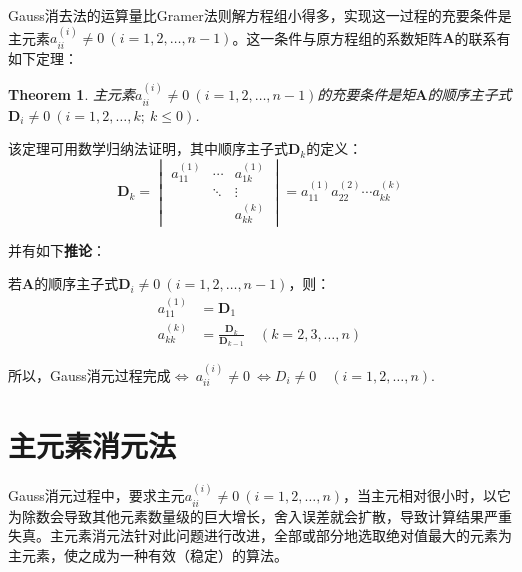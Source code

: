 Gauss消去法的运算量比Gramer法则解方程组小得多，实现这一过程的充要条件是主元素$a_{ii}^{(i)} \neq 0\ (i=1,2,\dots,n-1)$。这一条件与原方程组的系数矩阵$\boldsymbol{A}$的联系有如下定理：
\newtheorem{th4}{Theorem}[chapter]
\begin{th4}
    主元素$a_{ii}^{(i)} \neq 0\ (i=1,2,\dots,n-1)$的充要条件是矩$\boldsymbol{A}$的顺序主子式$\boldsymbol{D}_i \neq 0\ (i=1,2,\dots,k;\ k\leqslant 0)$.
\end{th4}

该定理可用数学归纳法证明，其中顺序主子式$\boldsymbol{D}_k$的定义：
\begin{equation}
    \boldsymbol{D}_k = 
        \begin{vmatrix}
            a_{11}^{(1)} & \cdots & a_{1k}^{(1)} \\
            \  & \ddots & \vdots \\
            \  & \  & a_{kk}^{(k)}
        \end{vmatrix}
        = a_{11}^{(1)}a_{22}^{(2)}\cdots a_{kk}^{(k)}
\end{equation}

并有如下\textbf{推论}：

若$\boldsymbol{A}$的顺序主子式$\boldsymbol{D}_i \neq 0\ (i=1,2,\dots,n-1)$，则：
\begin{align*}
    a_{11}^{(1)} &= \boldsymbol{D}_1 \\[4mm]
    a_{kk}^{(k)} &= \frac{\boldsymbol{D}_k}{\boldsymbol{D}_{k-1}} \quad (k=2,3,\dots,n)
\end{align*}

所以，Gauss消元过程完成$\Leftrightarrow\ a_{ii}^{(i)}\neq 0\ \Leftrightarrow D_i\neq 0\quad (i=1,2,\dots,n)$.


\newpage
\section{主元素消元法}
Gauss消元过程中，要求主元$a_{ii}^{(i)}\neq 0\ (i=1,2,\dots,n)$，当主元相对很小时，以它为除数会导致其他元素数量级的巨大增长，舍入误差就会扩散，导致计算结果严重失真。主元素消元法针对此问题进行改进，全部或部分地选取绝对值最大的元素为主元素，使之成为一种有效（稳定）的算法。

